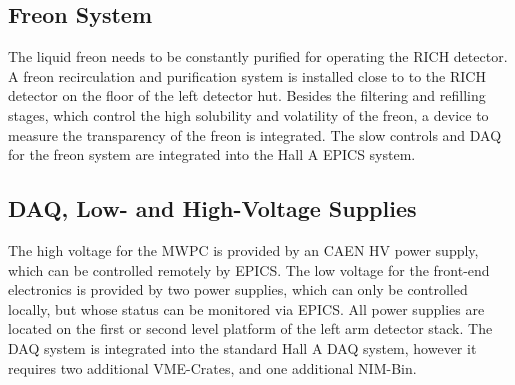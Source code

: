{\subsection{Freon System}
The liquid freon needs to be constantly purified for operating the RICH detector.
A freon recirculation and purification system is installed close to to the RICH detector 
on the floor of the left detector hut. Besides the filtering and refilling stages,
which control the high solubility and volatility of the freon, a device to measure
the transparency of the freon is integrated. The slow controls and DAQ for the freon
system are integrated into the Hall A EPICS system.

\subsection{DAQ, Low- and High-Voltage Supplies}
The high voltage for the MWPC is provided by an CAEN HV power supply, which can
be controlled remotely by EPICS. The low voltage for the front-end electronics 
is provided by two power supplies, which can only be controlled locally, but
whose status can be monitored via EPICS.
All power supplies are located on the first or second level platform of the 
left arm detector stack. The DAQ system is integrated into the standard Hall A 
DAQ system, however it requires two additional VME-Crates, and one additional 
NIM-Bin.
}

